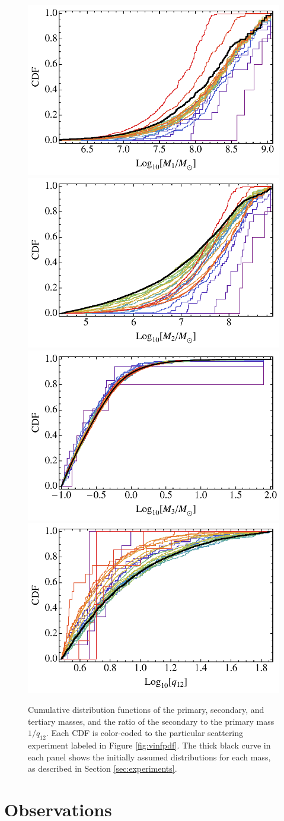 \documentclass[a4paper,twocolumn]{emulateapj}
\begin{document}
\begin{figure}
\centering\includegraphics[width=0.45\linewidth,clip=true]{m1CDF}\includegraphics[width=0.45\linewidth,clip=true]{m2CDF}\\
\centering\includegraphics[width=0.45\linewidth,clip=true]{m3CDF}\includegraphics[width=0.45\linewidth,clip=true]{qCDF}
\caption{Cumulative distribution functions of the primary, secondary, and tertiary masses, and the ratio of the secondary to the primary mass $1/q_{12}$. Each CDF is color-coded to the particular scattering experiment labeled in Figure \ref{fig:vinfpdf}. The thick black curve in each panel shows the initially assumed distributions for each mass, as described in Section \ref{sec:experiments}.}
\label{fig:mcdf}
\end{figure}

\section{Observations}\label{sec:observations}
\end{document}
